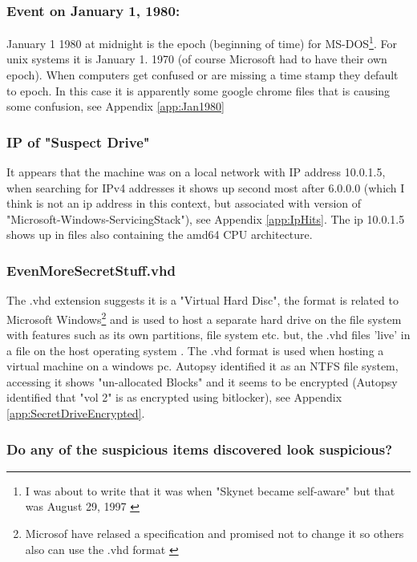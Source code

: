 \documentclass[
	letterpaper, %
	10pt, %
	unnumberedsections, %
	twoside, %
]{APAAssignment}
\begin{document}
\subsubsection{Event on January 1, 1980:}
January 1 1980 at midnight is the epoch (beginning of time) for MS-DOS\footnote{I was about to write that it was when "Skynet became self-aware" but that was August 29, 1997 \cite{enwiki:Terminator}}. For unix systems it is January 1. 1970 (of course Microsoft had to have their own epoch). When computers get confused or are missing a time stamp they default to epoch. In this case it is apparently some google chrome files that is causing some confusion, see Appendix \ref{app:Jan1980}

\subsubsection{IP of "Suspect Drive"}
It appears that the machine was on a local network with IP address 10.0.1.5, when searching for IPv4 addresses it shows up second most after 6.0.0.0 (which I think is not an ip address in this context, but associated with version of "Microsoft-Windows-ServicingStack"), see Appendix \ref{app:IpHits}. The ip 10.0.1.5 shows up in files also containing the amd64 CPU architecture.


\subsubsection{EvenMoreSecretStuff.vhd}
The .vhd extension suggests it is a "Virtual Hard Disc", the format is related to Microsoft Windows\footnote{Microsof have relased a specification and promised not to change it so others also can use the .vhd format \cite{VHD_Wiki}} and is used to host a separate hard drive on the file system with features such as its own partitions, file system etc. but, the .vhd files 'live' in a file on the host operating system \cite{VHD_Wiki}. The .vhd format is used when hosting a virtual machine on a windows pc. Autopsy identified it as an NTFS file system, accessing it shows "un-allocated Blocks" and it seems to be encrypted (Autopsy identified that "vol 2" is as encrypted using bitlocker), see Appendix \ref{app:SecretDriveEncrypted}.


\subsubsection{Do any of the suspicious items discovered look suspicious?}
\end{document}
